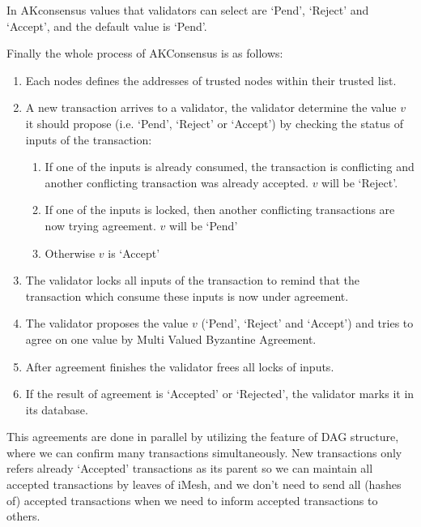 \documentclass[a4paper,10pt,twocolumn]{article}
\begin{document}
In AKconsensus values that validators can select are `Pend', `Reject' and `Accept', and the default value is `Pend'.

	\vspace{2.5mm}
	
	Finally the whole process of AKConsensus is as follows:
	
	\vspace{-0.5\baselineskip}
	\begin{enumerate}
		\setlength\itemsep{0em}
		\item Each nodes defines the addresses of trusted nodes within their trusted list.
		\item A new transaction arrives to a validator, the validator determine the value \(v \)  it should propose (i.e. `Pend', `Reject' or `Accept') 
		by checking the status of inputs of the transaction:
		\begin{enumerate}
			\setlength\itemsep{0em}
			\item If one of the inputs is already consumed, the transaction is conflicting and another conflicting transaction was already accepted.
			\(v \)  will be `Reject'.
			\item If one of the inputs is  locked, then another conflicting transactions are now trying agreement. \(v \) will be `Pend'
			\item Otherwise \(v \)  is `Accept'
		\end{enumerate}	
		\item The validator locks all inputs of the transaction to remind that the transaction which consume these inputs is now under agreement.
		\item The validator proposes  the value \(v\) (`Pend', `Reject' and `Accept') and tries to agree on one value  by Multi Valued Byzantine Agreement.
		\item After agreement finishes the validator frees all locks of inputs. 
		\item If the result of agreement is `Accepted' or `Rejected', the validator marks it in its database.
	\end{enumerate}
	
	This agreements are done in parallel by utilizing the feature of DAG structure, where we can confirm many transactions simultaneously.
New transactions  only refers already `Accepted' transactions as its parent so we can maintain all accepted transactions by leaves of iMesh, and we don't need to 
send all (hashes of) accepted transactions when we need to inform accepted transactions to others.
\end{document}
